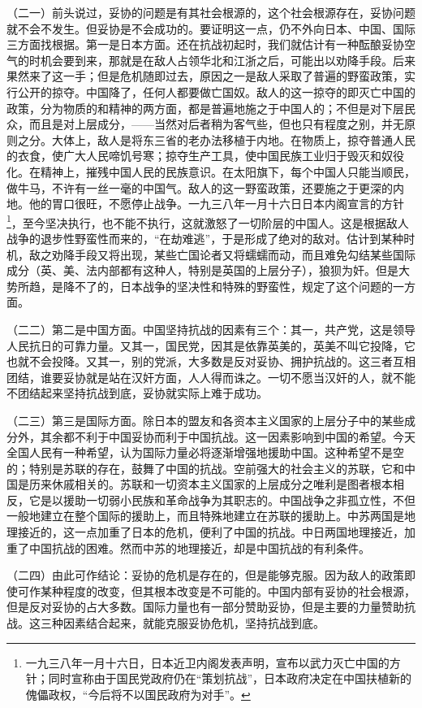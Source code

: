 \documentclass[UTF8, 12pt, a4paper]{ctexrep}
\begin{document}
（二一）前头说过，妥协的问题是有其社会根源的，这个社会根源存在，妥协问题就不会不发生。但妥协是不会成功的。要证明这一点，仍不外向日本、中国、国际三方面找根据。第一是日本方面。还在抗战初起时，我们就估计有一种酝酿妥协空气的时机会要到来，那就是在敌人占领华北和江浙之后，可能出以劝降手段。后来果然来了这一手；但是危机随即过去，原因之一是敌人采取了普遍的野蛮政策，实行公开的掠夺。中国降了，任何人都要做亡国奴。敌人的这一掠夺的即灭亡中国的政策，分为物质的和精神的两方面，都是普遍地施之于中国人的；不但是对下层民众，而且是对上层成分，——当然对后者稍为客气些，但也只有程度之别，并无原则之分。大体上，敌人是将东三省的老办法移植于内地。在物质上，掠夺普通人民的衣食，使广大人民啼饥号寒；掠夺生产工具，使中国民族工业归于毁灭和奴役化。在精神上，摧残中国人民的民族意识。在太阳旗下，每个中国人只能当顺民，做牛马，不许有一丝一毫的中国气。敌人的这一野蛮政策，还要施之于更深的内地。他的胃口很旺，不愿停止战争。一九三八年一月十六日日本内阁宣言的方针\footnote{一九三八年一月十六日，日本近卫内阁发表声明，宣布以武力灭亡中国的方针；同时宣称由于国民党政府仍在“策划抗战”，日本政府决定在中国扶植新的傀儡政权，“今后将不以国民政府为对手”。}，至今坚决执行，也不能不执行，这就激怒了一切阶层的中国人。这是根据敌人战争的退步性野蛮性而来的，“在劫难逃”，于是形成了绝对的敌对。估计到某种时机，敌之劝降手段又将出现，某些亡国论者又将蠕蠕而动，而且难免勾结某些国际成分（英、美、法内部都有这种人，特别是英国的上层分子），狼狈为奸。但是大势所趋，是降不了的，日本战争的坚决性和特殊的野蛮性，规定了这个问题的一方面。

（二二）第二是中国方面。中国坚持抗战的因素有三个：其一，共产党，这是领导人民抗日的可靠力量。又其一，国民党，因其是依靠英美的，英美不叫它投降，它也就不会投降。又其一，别的党派，大多数是反对妥协、拥护抗战的。这三者互相团结，谁要妥协就是站在汉奸方面，人人得而诛之。一切不愿当汉奸的人，就不能不团结起来坚持抗战到底，妥协就实际上难于成功。

（二三）第三是国际方面。除日本的盟友和各资本主义国家的上层分子中的某些成分外，其余都不利于中国妥协而利于中国抗战。这一因素影响到中国的希望。今天全国人民有一种希望，认为国际力量必将逐渐增强地援助中国。这种希望不是空的；特别是苏联的存在，鼓舞了中国的抗战。空前强大的社会主义的苏联，它和中国是历来休戚相关的。苏联和一切资本主义国家的上层成分之唯利是图者根本相反，它是以援助一切弱小民族和革命战争为其职志的。中国战争之非孤立性，不但一般地建立在整个国际的援助上，而且特殊地建立在苏联的援助上。中苏两国是地理接近的，这一点加重了日本的危机，便利了中国的抗战。中日两国地理接近，加重了中国抗战的困难。然而中苏的地理接近，却是中国抗战的有利条件。

（二四）由此可作结论：妥协的危机是存在的，但是能够克服。因为敌人的政策即使可作某种程度的改变，但其根本改变是不可能的。中国内部有妥协的社会根源，但是反对妥协的占大多数。国际力量也有一部分赞助妥协，但是主要的力量赞助抗战。这三种因素结合起来，就能克服妥协危机，坚持抗战到底。
\end{document}
